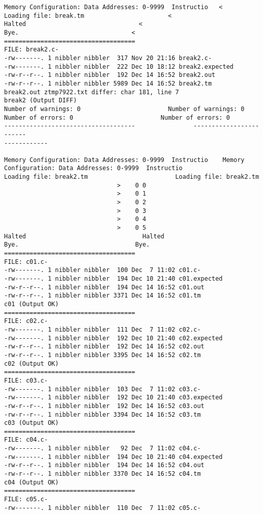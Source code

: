 \documentclass[12pt]{book}
\begin{document}
\begin{lstlisting}
Memory Configuration: Data Addresses: 0-9999  Instructio   <
Loading file: break.tm                       <
Halted                               <
Bye.                               <
====================================
FILE: break2.c-
-rw-------. 1 nibbler nibbler  317 Nov 20 21:16 break2.c-
-rw-------. 1 nibbler nibbler  222 Dec 10 18:12 break2.expected
-rw-r--r--. 1 nibbler nibbler  192 Dec 14 16:52 break2.out
-rw-r--r--. 1 nibbler nibbler 5989 Dec 14 16:52 break2.tm
break2.out ztmp7922.txt differ: char 181, line 7
break2 (Output DIFF)
Number of warnings: 0                        Number of warnings: 0
Number of errors: 0                        Number of errors: 0
------------------------------------                ------------------------
------------

Memory Configuration: Data Addresses: 0-9999  Instructio    Memory 
Configuration: Data Addresses: 0-9999  Instructio
Loading file: break2.tm                        Loading file: break2.tm
                               >    0 0 
                               >    0 1 
                               >    0 2 
                               >    0 3 
                               >    0 4 
                               >    0 5 
Halted                                Halted
Bye.                                Bye.
====================================
FILE: c01.c-
-rw-------. 1 nibbler nibbler  100 Dec  7 11:02 c01.c-
-rw-------. 1 nibbler nibbler  194 Dec 10 21:40 c01.expected
-rw-r--r--. 1 nibbler nibbler  194 Dec 14 16:52 c01.out
-rw-r--r--. 1 nibbler nibbler 3371 Dec 14 16:52 c01.tm
c01 (Output OK)
====================================
FILE: c02.c-
-rw-------. 1 nibbler nibbler  111 Dec  7 11:02 c02.c-
-rw-------. 1 nibbler nibbler  192 Dec 10 21:40 c02.expected
-rw-r--r--. 1 nibbler nibbler  192 Dec 14 16:52 c02.out
-rw-r--r--. 1 nibbler nibbler 3395 Dec 14 16:52 c02.tm
c02 (Output OK)
====================================
FILE: c03.c-
-rw-------. 1 nibbler nibbler  103 Dec  7 11:02 c03.c-
-rw-------. 1 nibbler nibbler  192 Dec 10 21:40 c03.expected
-rw-r--r--. 1 nibbler nibbler  192 Dec 14 16:52 c03.out
-rw-r--r--. 1 nibbler nibbler 3394 Dec 14 16:52 c03.tm
c03 (Output OK)
====================================
FILE: c04.c-
-rw-------. 1 nibbler nibbler   92 Dec  7 11:02 c04.c-
-rw-------. 1 nibbler nibbler  194 Dec 10 21:40 c04.expected
-rw-r--r--. 1 nibbler nibbler  194 Dec 14 16:52 c04.out
-rw-r--r--. 1 nibbler nibbler 3370 Dec 14 16:52 c04.tm
c04 (Output OK)
====================================
FILE: c05.c-
-rw-------. 1 nibbler nibbler  110 Dec  7 11:02 c05.c-

\end{lstlisting}
\end{document}
